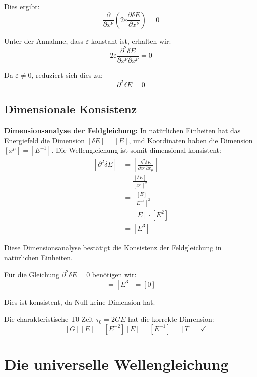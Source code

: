 \documentclass[12pt,a4paper]{report}
\begin{document}
Dies ergibt:
\begin{equation}
	\frac{\partial}{\partial x^\nu}\left(2\varepsilon \frac{\partial \delta E}{\partial x^\nu}\right) = 0
\end{equation}

Unter der Annahme, dass $\varepsilon$ konstant ist, erhalten wir:
\begin{equation}
	2\varepsilon \frac{\partial^2 \delta E}{\partial x^\nu \partial x^\nu} = 0
\end{equation}

Da $\varepsilon \neq 0$, reduziert sich dies zu:
\begin{equation}
	\partial^2 \delta E = 0
\end{equation}

\subsection{Dimensionale Konsistenz}

\textbf{Dimensionsanalyse der Feldgleichung:}
In natürlichen Einheiten hat das Energiefeld die Dimension $[\delta E] = [E]$, und Koordinaten haben die Dimension $[x^\mu] = [E^{-1}]$. Die Wellengleichung ist somit dimensional konsistent:
\begin{align}
	\left[\partial^2 \delta E\right] &= \left[\frac{\partial^2 \delta E}{\partial x^\mu \partial x_\mu}\right] \\
	&= \frac{[\delta E]}{[x^\mu]^2} \\
	&= \frac{[E]}{[E^{-1}]^2} \\
	&= [E] \cdot [E^2] \\
	&= [E^3]
\end{align}

Diese Dimensionsanalyse bestätigt die Konsistenz der Feldgleichung in natürlichen Einheiten.

Für die Gleichung $\partial^2 \delta E = 0$ benötigen wir:
\begin{equation}
	[\partial^2 \delta E] = [E^3] = [0]
\end{equation}

Dies ist konsistent, da Null keine Dimension hat.

Die charakteristische T0-Zeit $\tau_0 = 2GE$ hat die korrekte Dimension:
\begin{equation}
	[\tau_0] = [G][E] = [E^{-2}][E] = [E^{-1}] = [T] \quad \checkmark
\end{equation}

\section{Die universelle Wellengleichung}
\end{document}
